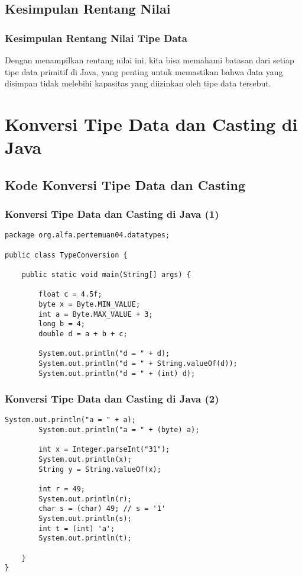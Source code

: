 \documentclass[aspectratio=169, table]{beamer}
\begin{document}
\subsection{Kesimpulan Rentang Nilai}
\begin{frame}[fragile]
	\frametitle{Kesimpulan Rentang Nilai Tipe Data}
	Dengan menampilkan rentang nilai ini, kita bisa memahami batasan dari setiap tipe data primitif di Java, yang penting untuk memastikan bahwa data yang disimpan tidak melebihi kapasitas yang diizinkan oleh tipe data tersebut.
\end{frame}

\section{Konversi Tipe Data dan Casting di Java}

\subsection{Kode Konversi Tipe Data dan Casting}

\begin{frame}[fragile]
\vspace{15pt}
\frametitle{Konversi Tipe Data dan Casting di Java (1)}
\begin{lstlisting}[style=JavaStyle]
package org.alfa.pertemuan04.datatypes;

public class TypeConversion {
	
	public static void main(String[] args) {
		
		float c = 4.5f;
		byte x = Byte.MIN_VALUE;
		int a = Byte.MAX_VALUE + 3;
		long b = 4;
		double d = a + b + c;
		
		System.out.println("d = " + d);
		System.out.println("d = " + String.valueOf(d));
		System.out.println("d = " + (int) d);
	\end{lstlisting}
\end{frame}

\begin{frame}[fragile]
\vspace{15pt}
	\frametitle{Konversi Tipe Data dan Casting di Java (2)}
	\begin{lstlisting}[style=JavaStyle]
		System.out.println("a = " + a);
		System.out.println("a = " + (byte) a);
		
		int x = Integer.parseInt("31");
		System.out.println(x);
		String y = String.valueOf(x);
		
		int r = 49;
		System.out.println(r);
		char s = (char) 49; // s = '1'
		System.out.println(s);
		int t = (int) 'a';
		System.out.println(t);
		
	}
}
\end{lstlisting}
\end{frame}
\end{document}
